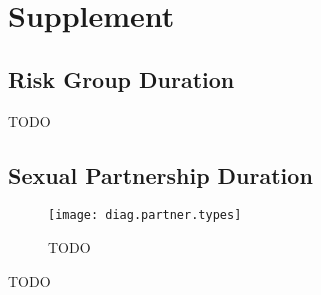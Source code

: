 \section{Supplement}
\subsection{Risk Group Duration}\label{app.yss}
\begin{table}
  \centering
  \caption{TODO}
  
  \label{tab:yss}
\end{table}
\subsection{Sexual Partnership Duration}\label{app.partners}
\begin{figure}[h]
  \texttt{[image: diag.partner.types]}
  \caption{TODO}
  \label{fig:diag.partner.types}
\end{figure}
\begin{table}
  \centering
  \caption{TODO}
  
  \label{tab:partners.fsw}
\end{table}

